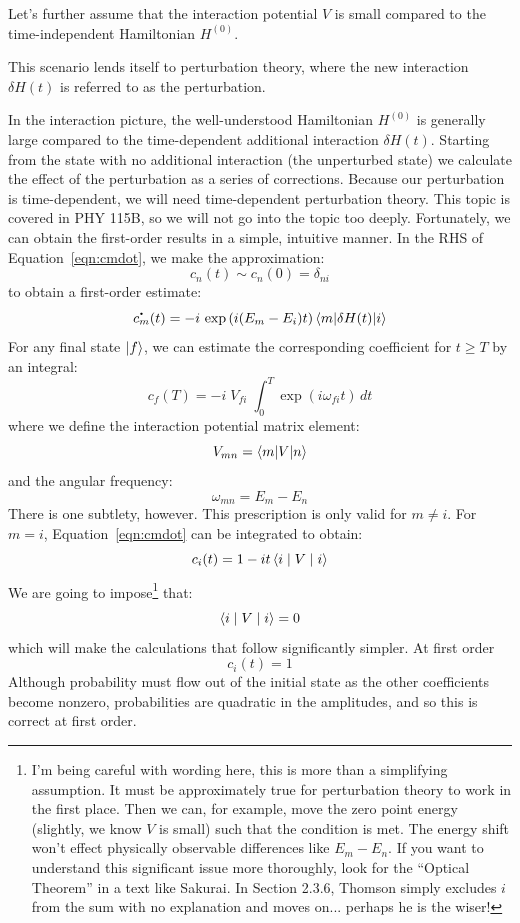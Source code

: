 \documentclass[12pt]{article}
\newcommand*{\dt}[1]{%
  \accentset{\mbox{\large\bfseries .}}{#1}}
\begin{document}
Let's further assume that the interaction potential $V$ is small
compared to the time-independent Hamiltonian $H^{(0)}$.

This scenario lends itself to perturbation
theory, where the new interaction $\delta H(t)$ is referred to as the
perturbation.

In the interaction picture, the well-understood Hamiltonian $H^{(0)}$
is generally large compared to the time-dependent additional
interaction $\delta H(t)$.  Starting from the state with no additional
interaction (the unperturbed state) we calculate the effect of the
perturbation as a series of corrections.  Because our perturbation is
time-dependent, we will need time-dependent perturbation theory.  This
topic is covered in PHY 115B, so we will not go into the topic too
deeply.  Fortunately, we can obtain the first-order results in a
simple, intuitive manner.  In the RHS of Equation~\ref{eqn:cmdot}, we make the
approximation:
$$c_n(t) \sim c_n(0) = \delta_{ni}$$
to obtain a first-order estimate:
\begin{equation}
\label{eqn:cmdot-first-order}
\dt{c_m}(t)  = -i  \, \exp\left( i (E_m - E_i) t \right)
\braket{m | \delta H(t) | i}
\end{equation}
For any final state $\ket{f}$, we can estimate the corresponding coefficient for $t \geq T$ by an integral:
$$c_f(T) = -i  \; V_{fi} \; \int_0^T \exp\left( i \omega_{fi} t \right) \, dt$$
where we define the interaction potential matrix element:
\begin{equation}
V_{mn} = \braket{m|V|n}
\end{equation}
and the angular frequency:
\begin{equation}
\omega_{mn} = E_m - E_n
\end{equation}
There is one subtlety, however.  This prescription is only valid for
$m \neq i$.  For $m=i$, Equation~\ref{eqn:cmdot} can be integrated to obtain:
$$c_i(t) = 1 - i t \braket{i \mid V \mid i}$$
We are going to impose\footnote{I'm being careful with wording here,
this is more than a simplifying assumption.  It must be approximately
true for perturbation theory to work in the first place.  Then we can,
for example, move the zero point energy (slightly, we know $V$ is
small) such that the condition is met.  The energy shift won't effect
physically observable differences like $E_m - E_n$.  If you want to
understand this significant issue more thoroughly, look for the
``Optical Theorem'' in a text like Sakurai.  In Section 2.3.6, Thomson
simply excludes $i$ from the sum with no explanation and moves
on... perhaps he is the wiser!}  that:
$$\braket{i \mid V \mid i} = 0$$
which will make the calculations that follow significantly simpler.  At first order
$$c_i(t) = 1$$
Although probability must flow out of the initial state as the other
coefficients become nonzero, probabilities are quadratic in the
amplitudes, and so this is correct at first order.
\end{document}
